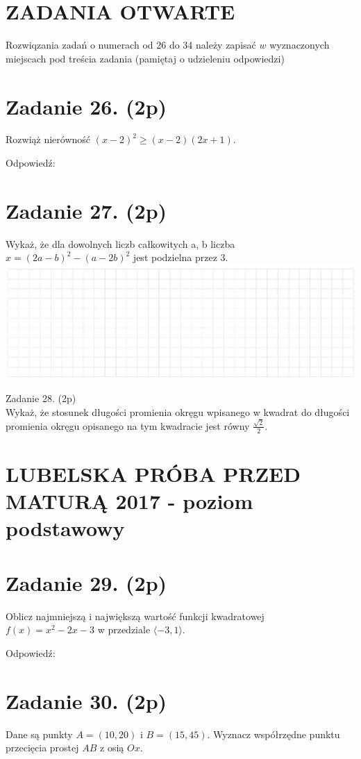 \documentclass[10pt]{article}
\begin{document}
\section*{ZADANIA OTWARTE}
Rozwiqzania zadań o numerach od 26 do 34 należy zapisać \(w\) wyznaczonych miejscach pod treścia zadania (pamiętaj o udzieleniu odpowiedzi)

\section*{Zadanie 26. (2p)}
Rozwiąż nierówność \((x-2)^{2} \geq(x-2)(2 x+1)\).

Odpowiedź:

\section*{Zadanie 27. (2p)}
Wykaż, że dla dowolnych liczb całkowitych a, b liczba \(x=(2 a-b)^{2}-(a-2 b)^{2}\) jest podzielna przez 3.\\
\includegraphics[max width=\textwidth, center]{2024_11_21_d45b0573b36a3462565cg-09}

Zadanie 28. (2p)\\
Wykaż, że stosunek długości promienia okręgu wpisanego w kwadrat do długości promienia okręgu opisanego na tym kwadracie jest równy \(\frac{\sqrt{2}}{2}\).

\section*{LUBELSKA PRÓBA PRZED MATURĄ 2017 - poziom podstawowy}
\section*{Zadanie 29. (2p)}
Oblicz najmniejszą i największą wartość funkcji kwadratowej \(f(x)=x^{2}-2 x-3\) w przedziale \(\langle-3,1\rangle\).

Odpowiedź:

\section*{Zadanie 30. (2p)}
Dane są punkty \(A=(10,20)\) i \(B=(15,45)\). Wyznacz współrzędne punktu przecięcia prostej \(A B\) z osią \(O x\).
\end{document}
